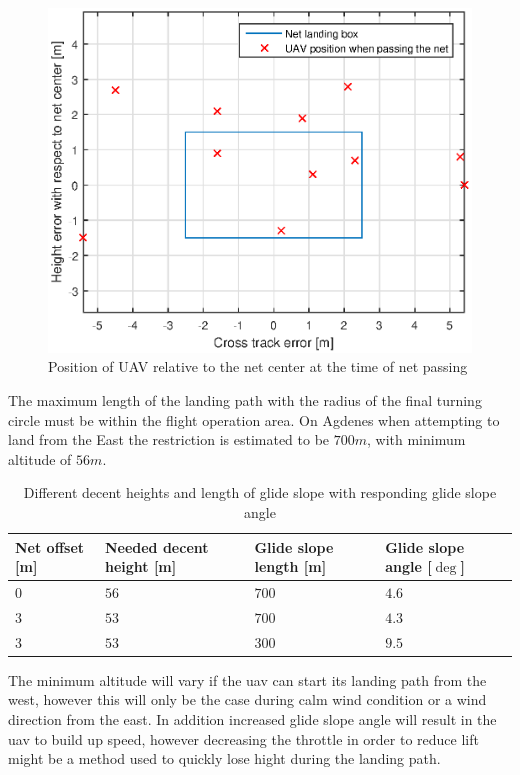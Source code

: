 \begin{figure}[H]
\centering
\includegraphics[scale=0.7]{figs/Experiment/day1NetHit.eps}
\caption{Position of UAV relative to the net center at the time of net passing}
\label{Fig:Day1NetPass}
\end{figure}
The maximum length of the landing path with the radius of the final turning circle must be within the flight operation area. On Agdenes when attempting to land from the East the restriction is estimated to be $700 m$, with minimum altitude of $56 m$. 
\begin{table}
\centering
\begin{tabular}{| p{2cm} | p{4cm} | p{2cm} | p{2cm} |}
\hline
\textbf{Net offset [m]}	& \textbf{Needed decent height [m]}& \textbf{Glide slope length [m]}& \textbf{Glide slope angle [$\deg$]}	\\ \hline
$0$						& $56$													&$700$							& $4.6$			\\ \hline
$3$						& $53$													&$700$							& $4.3$			\\ \hline
$3$						& $53$													&$300$							& $9.5$			\\ \hline
\end{tabular}
\caption{Different decent heights and length of glide slope with responding glide slope angle}
\label{Tb:GlideSlopeAngles}
\end{table}
The minimum altitude will vary if the \gls{uav} can start its landing path from the west, however this will only be the case during calm wind condition or a wind direction from the east. In addition increased glide slope angle will result in the \gls{uav} to build up speed, however decreasing the throttle in order to reduce lift might be a method used to quickly lose hight during the landing path.
